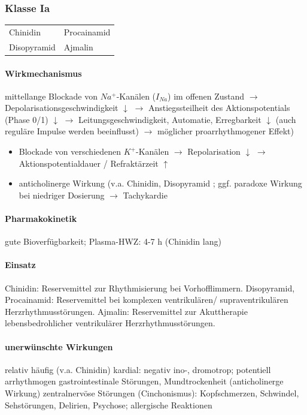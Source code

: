 \documentclass[10pt,a4paper]{report}
\begin{document}
\subsubsection{Klasse Ia} %

\begin{tabularx}{\textwidth}{XX}
Chinidin&Procainamid\\
Disopyramid&Ajmalin\\
\end{tabularx}

\paragraph{Wirkmechanismus} mittellange Blockade von $Na^+$-Kanälen ($I_{Na}$) im offenen Zustand $\rightarrow$ Depolarisationsgeschwindigkeit $\downarrow$ $\rightarrow$ Anstiegssteilheit des Aktionspotentials (Phase 0/1) $\downarrow$ $\rightarrow$ Leitungsgeschwindigkeit, Automatie, Erregbarkeit $\downarrow$ (auch reguläre Impulse werden beeinflusst) $\rightarrow$ möglicher proarrhythmogener  Effekt)

\begin{itemize}
	\item Blockade von verschiedenen $K^+$-Kanälen $\rightarrow$ Repolarisation $\downarrow$ $\rightarrow$ Aktionspotentialdauer / Refraktärzeit $\uparrow$
	\item anticholinerge Wirkung (v.a. Chinidin, Disopyramid ; ggf. paradoxe Wirkung bei niedriger Dosierung  $\rightarrow$ Tachykardie
\end{itemize}

\paragraph{Pharmakokinetik} gute Bioverfügbarkeit; Plasma-HWZ: 4-7 h (Chinidin lang)

\paragraph{Einsatz}	Chinidin: Reservemittel zur Rhythmisierung bei Vorhofflimmern. Disopyramid, Procainamid: Reservemittel bei komplexen ventrikulären/ supraventrikulären Herzrhythmusstörungen. Ajmalin: Reservemittel zur Akuttherapie lebensbedrohlicher ventrikulärer Herzrhythmusstörungen.

\paragraph{unerwünschte Wirkungen} relativ häufig (v.a. Chinidin) kardial: negativ ino-, dromotrop; potentiell arrhythmogen
gastrointestinale Störungen, Mundtrockenheit (anticholinerge Wirkung) zentralnervöse Störungen (Cinchonismus): Kopfschmerzen, Schwindel, Sehstörungen, Delirien, Psychose;   allergische Reaktionen
\end{document}
